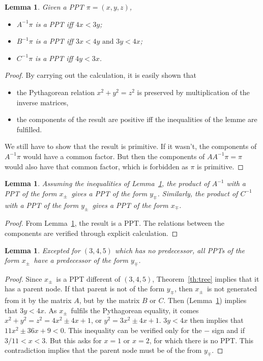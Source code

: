 \documentclass[11pt, twoside, a4paper]{article}
\newtheorem{lemma}[theorem]{Lemma}
\theoremstyle{definition}
\newcommand{\Th}[1]{Theorem~\ref{th:#1}}
\newcommand{\Le}[1]{Lemma~\ref{le:#1}}
\newcommand{\xpm}{\ensuremath{x_\pm}}
\newcommand{\xmp}{\ensuremath{x_\mp}}
\newcommand{\ypm}{\ensuremath{y_\pm}}
\newcommand{\ymp}{\ensuremath{y_\mp}}
\newcommand{\inv}[1]{#1^{-1}}
\begin{document}
\begin{lemma}\label{le:inverse}
Given a PPT $\pi\!=\!(x, y, z)$, 
\begin{itemize}
\item $\inv A\pi$ is a PPT iff $4x<3y$;
\item $\inv B\pi$ is a PPT iff $3x<4y \text{ and } 3y<4x$;
\item $\inv C\pi$ is a PPT iff $4y<3x$.
\end{itemize}
\end{lemma}
\begin{proof}
By carrying out the calculation, it is easily shown that
\begin{itemize}
    \item the Pythagorean relation $x^2+y^2=z^2$ is preserved by multiplication of the inverse matrices, 
    \item the components of the result are positive iff the inequalities of the lemme are fulfilled.
\end{itemize}
We still have to show that the result is primitive. If it wasn't, the components of $\inv A\pi$ would have a common factor. But then the components of $A\inv A\pi=\pi$ would also have that common factor, which is forbidden as $\pi$ is primitive.
\end{proof}

\begin{lemma}
Assuming the inequalities of \Le{inverse}, the product of $\inv A$ with a PPT of the form \xpm\ gives a PPT of the form \ymp. Similarly, the product of $\inv C$ with a PPT of the form \ypm\ gives a PPT of the form \xmp.
\end{lemma}
\begin{proof}
From \Le{inverse}, the result is a PPT. The relations between the components are verified through explicit calculation.
\end{proof}

\begin{lemma}\label{le:predecessor1}
Excepted for $(3, 4, 5)$ which has no predecessor, all PPTs of the form \xpm\ have a predecessor of the form \ymp.
\end{lemma}
\begin{proof}
Since \xpm\ is a PPT different of $(3, 4, 5)$, \Th{tree} implies that it has a parent node. If that parent is not of the form \ymp, then \xpm\ is not generated from it by the matrix $A$, but by the matrix $B$ or $C$. Then (\Le{inverse}) implies that $3y<4x$. As \xpm\ fulfils the Pythagorean equality, it comes $x^2+y^2=z^2=4x^2\pm4x+1$, or $y^2=3x^2\pm4x+1$. $3y<4x$ then implies that $11x^2\pm36x+9<0$. This inequality can be verified only for the $-$ sign and if $3/11<x<3$. But this asks for $x=1$ or $x=2$, for which there is no PPT. This contradiction implies that the parent node must be of the from \ymp.
\end{proof}
\end{document}
